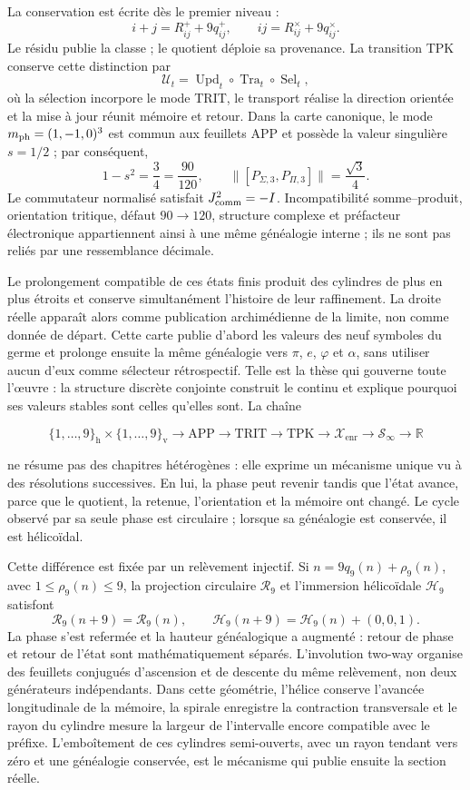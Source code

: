 La conservation est écrite dès le premier niveau :
\[
i+j=R^+_{ij}+9q^+_{ij},
\qquad
ij=R^\times_{ij}+9q^\times_{ij}.
\]
Le résidu publie la classe ; le quotient déploie sa provenance. La
transition TPK conserve cette distinction par
\[
\mathcal U_t=
\operatorname{Upd}_t\circ
\operatorname{Tra}_t\circ
\operatorname{Sel}_t,
\]
où la sélection incorpore le mode TRIT, le transport réalise la
direction orientée et la mise à jour réunit mémoire et retour. Dans la carte
canonique, le mode \(m_{\rm ph}=(1,-1,0)^3\) est commun aux feuillets APP et possède
la valeur singulière \(s=1/2\) ; par conséquent,
\[
1-s^2=\frac34=\frac{90}{120},
\qquad
\bigl\|[P_{\Sigma,3},P_{\Pi,3}]\bigr\|
=\frac{\sqrt3}{4}.
\]
Le commutateur normalisé satisfait \(J_{\rm comm}^2=-I\). Incompatibilité
somme--produit, orientation tritique, défaut \(90\to120\), structure
complexe et préfacteur électronique appartiennent ainsi à une même généalogie
interne ; ils ne sont pas reliés par une ressemblance décimale.

Le prolongement compatible de ces états finis produit des cylindres de plus
en plus étroits et conserve simultanément l'histoire de leur raffinement.
La droite réelle apparaît alors comme publication archimédienne de la limite, non
comme donnée de départ. Cette carte publie d'abord les valeurs des neuf
symboles du germe et prolonge ensuite la même généalogie vers
\(\pi\), \(e\), \(\varphi\) et \(\alpha\), sans utiliser aucun d'eux comme
sélecteur rétrospectif. Telle est la thèse qui gouverne toute l'œuvre : la
structure discrète conjointe construit le continu et explique pourquoi ses
valeurs stables sont celles qu'elles sont. La chaîne

\[
\{1,\ldots,9\}_{\mathrm h}\times\{1,\ldots,9\}_{\mathrm v}
\longrightarrow \mathrm{APP}\longrightarrow\mathrm{TRIT}
\longrightarrow\mathrm{TPK}\longrightarrow\mathcal X_{\mathrm{enr}}
\longrightarrow\mathcal S_\infty
\longrightarrow\mathbb R
\]

ne résume pas des chapitres hétérogènes : elle exprime un mécanisme unique vu à des
résolutions successives. En lui, la phase peut revenir tandis que l'état avance,
parce que le quotient, la retenue, l'orientation et la mémoire ont changé. Le
cycle observé par sa seule phase est circulaire ; lorsque sa généalogie est conservée, il est
hélicoïdal.

Cette différence est fixée par un relèvement injectif. Si
\(n=9q_9(n)+\rho_9(n)\), avec \(1\leq\rho_9(n)\leq9\), la projection circulaire
\(\mathcal R_9\) et l'immersion hélicoïdale \(\mathcal H_9\) satisfont
\[
\mathcal R_9(n+9)=\mathcal R_9(n),\qquad
\mathcal H_9(n+9)=\mathcal H_9(n)+(0,0,1).
\]
La phase s'est refermée et la hauteur généalogique a augmenté : retour de phase et
retour de l'état sont mathématiquement séparés. L'involution two-way
organise des feuillets conjugués d'ascension et de descente du même relèvement, non
deux générateurs indépendants. Dans cette géométrie, l'hélice conserve
l'avancée longitudinale de la mémoire, la spirale enregistre la contraction
transversale et le rayon du cylindre mesure la largeur de l'intervalle encore
compatible avec le préfixe. L'emboîtement de ces cylindres semi-ouverts,
avec un rayon tendant vers zéro et une généalogie conservée, est le mécanisme qui
publie ensuite la section réelle.

